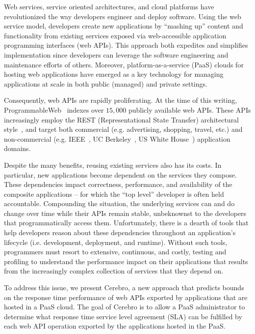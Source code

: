 Web services, service oriented architectures, and cloud platforms have
revolutionized the way developers engineer and deploy software.
Using the web service model, developers create new applications
by ``mashing up'' content and functionality 
from existing services 
exposed via web-accessible application programming interfaces (web APIs).
This approach both expedites and simplifies implementation since 
developers can leverage the 
software engineering and maintenance efforts of others.
Moreover, platform-as-a-service (PaaS) clouds
for hosting web applications have emerged as a key
technology for managing applications at scale in both public (managed) and 
private settings.  

Consequently, web APIs are rapidly 
proliferating.  At the time of this writing, 
ProgrammableWeb~\cite{pweb} indexes over $15,000$
publicly available web APIs.
These APIs increasingly employ the REST (Representational State Transfer) 
architectural style~\cite{Fielding:2000:ASD:932295}, and target both
commercial (e.g. advertising, shopping, travel, etc.) and non-commercial
(e.g. IEEE~\cite{ieeeapis}, UC Berkeley~\cite{ucbapis}, US White
House~\cite{whitehouseapis}) application domains.

Despite the many benefits, reusing existing services also has its costs.  
In particular, new applications become dependent on the 
services they compose.  These dependencies
impact correctness, performance, and availability of the composite 
applications -- for which the ``top level'' developer is often held accountable.  
Compounding the situation, the underlying services can and do change over time
while their APIs remain stable,
unbeknownst to the developers that programmatically access them.
Unfortunately, there is a dearth of tools that help developers reason about these 
dependencies throughout an application's 
lifecycle (i.e. development, deployment, and runtime).  Without such tools, 
programmers must resort to extensive, continuous, and costly, testing and profiling 
to understand the performance impact on their applications
that results from the increasingly complex collection of
services that they depend on.

To address this issue, we present Cerebro, a new approach that
predicts bounds on 
the response time performance of web
APIs exported by applications that are hosted in a PaaS cloud.
The goal of Cerebro is to allow 
a PaaS administrator to determine what response time service level agreement (SLA) can be
fulfilled by each web API operation exported by the applications
hosted in the PaaS.  

